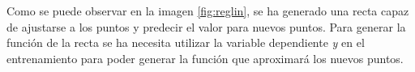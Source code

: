 Como se puede observar en la imagen \ref{fig:reglin}, se ha generado una recta capaz de ajustarse a los puntos y predecir el valor para nuevos puntos. Para generar la función de la recta se ha necesita utilizar la variable dependiente \textit{y} en el entrenamiento para poder generar la función que aproximará los nuevos puntos. 